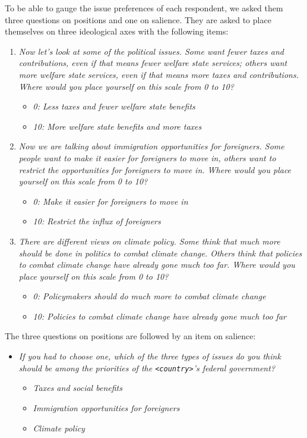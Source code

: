 \documentclass[12pt]{article}
\begin{document}
To be able to gauge the issue preferences of each respondent, we asked them three questions on positions and one on salience. They are asked to place themselves on three ideological axes with the following items: 
\begin{enumerate}
\item{\textit{Now let's look at some of the political issues. Some want fewer taxes and contributions, even if that means fewer welfare state services; others want more welfare state services, even if that means more taxes and contributions. Where would you place yourself on this scale from 0 to 10?}}
\begin{itemize}
  \item{\textit{0: Less taxes and fewer welfare state benefits}}
  \item{\textit{10: More welfare state benefits and more taxes}}
\end{itemize}
\item{\textit{Now we are talking about immigration opportunities for foreigners. Some people want to make it easier for foreigners to move in, others want to restrict the opportunities for foreigners to move in. Where would you place yourself on this scale from 0 to 10?}}
\begin{itemize}
  \item{\textit{0: Make it easier for foreigners to move in}}
  \item{\textit{10: Restrict the influx of foreigners}}
\end{itemize}
\item{\textit{There are different views on climate policy. Some think that much more should be done in politics to combat climate change. Others think that policies to combat climate change have already gone much too far. Where would you place yourself on this scale from 0 to 10?}}
\begin{itemize}
  \item{\textit{0: Policymakers should do much more to combat climate change}}
  \item{\textit{10: Policies to combat climate change have already gone much too far}}
\end{itemize}
\end{enumerate}
The three questions on positions are followed by an item on salience: 
\begin{itemize}
  \item[]\textit{If you had to choose one, which of the three types of issues do you think should be among the priorities of the \texttt{<country>}'s federal government?}
  \begin{itemize}
    \item{\textit{Taxes and social benefits}}
    \item{\textit{Immigration opportunities for foreigners}}
    \item{\textit{Climate policy}}
  \end{itemize}
\end{itemize}
\end{document}
